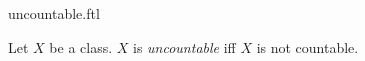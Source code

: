 \documentclass{stex}
\begin{document}
\begin{smodule}{uncountable.ftl}


\begin{definition}[forthel,id=UncountDef]
  Let $X$ be a class.
  $X$ is \emph{uncountable} iff $X$ is not countable.
\end{definition}

\end{smodule}
\end{document}
